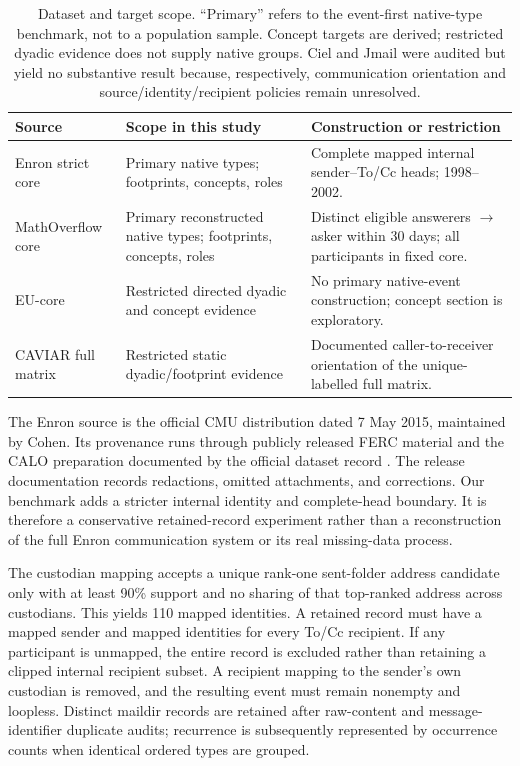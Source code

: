 \documentclass[10pt]{article}
\begin{document}
\begin{table}[H]
\centering
\caption{Dataset and target scope. ``Primary'' refers to the event-first native-type benchmark, not to a population sample. Concept targets are derived; restricted dyadic evidence does not supply native groups. Ciel and Jmail were audited but yield no substantive result because, respectively, communication orientation and source/identity/recipient policies remain unresolved.}
\label{tab:eligibility}
\small
\begin{tabular}{@{}P{0.19\textwidth}P{0.22\textwidth}P{0.51\textwidth}@{}}
\toprule
Source & Scope in this study & Construction or restriction\\
\midrule
Enron strict core & Primary native types; footprints, concepts, roles & Complete mapped internal sender--To/Cc heads; 1998--2002.\\
MathOverflow core & Primary reconstructed native types; footprints, concepts, roles & Distinct eligible answerers $\to$ asker within 30 days; all participants in fixed core.\\
EU-core & Restricted directed dyadic and concept evidence & No primary native-event construction; concept section is exploratory.\\
CAVIAR full matrix & Restricted static dyadic/footprint evidence & Documented caller-to-receiver orientation of the unique-labelled full matrix.\\
\bottomrule
\end{tabular}
\end{table}

The Enron source is the official CMU distribution dated 7 May 2015, maintained by Cohen. Its provenance runs through publicly released FERC material and the CALO preparation documented by the official dataset record \citep{cohen2015}. The release documentation records redactions, omitted attachments, and corrections. Our benchmark adds a stricter internal identity and complete-head boundary. It is therefore a conservative retained-record experiment rather than a reconstruction of the full Enron communication system or its real missing-data process.

The custodian mapping accepts a unique rank-one sent-folder address candidate only with at least 90\% support and no sharing of that top-ranked address across custodians. This yields 110 mapped identities. A retained record must have a mapped sender and mapped identities for every To/Cc recipient. If any participant is unmapped, the entire record is excluded rather than retaining a clipped internal recipient subset. A recipient mapping to the sender's own custodian is removed, and the resulting event must remain nonempty and loopless. Distinct maildir records are retained after raw-content and message-identifier duplicate audits; recurrence is subsequently represented by occurrence counts when identical ordered types are grouped.
\end{document}
